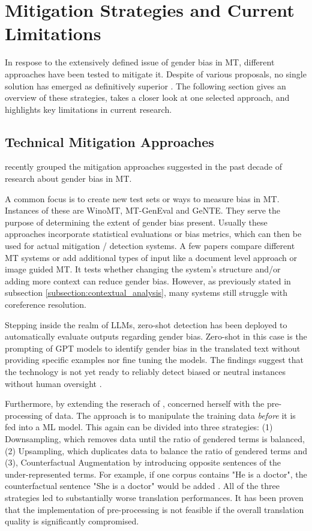 \section{Mitigation Strategies and Current Limitations}    

In respose to the extensively defined issue of gender bias in MT, different approaches have been tested to mitigate it. Despite of various proposals, no single solution has emerged as definitively superior \citep{savoldiDecadeGenderBias2025}. The following section gives an overview of these strategies, takes a closer look at one selected approach, and highlights key limitations in current research.

\subsection{Technical Mitigation Approaches}
\citet{savoldiDecadeGenderBias2025} recently grouped the mitigation approaches suggested in the past decade of research about gender bias in MT. 

A common focus is to create new test sets or ways to measure bias in MT. Instances of these are WinoMT, MT-GenEval and GeNTE. They serve the purpose of determining the extent of gender bias present. Usually these approaches incorporate statistical evaluations or bias metrics, which can then be used for actual mitigation / detection systems. A few papers compare different MT systems or add additional types of input like a document level approach or image guided MT. It tests whether changing the system's structure and/or adding more context can reduce gender bias. However, as previously stated in subsection \ref{subsection:contextual_analysis}, many systems still struggle with coreference resolution.

Stepping inside the realm of LLMs, zero-shot detection has been deployed to automatically evaluate outputs regarding gender bias. Zero-shot in this case is the prompting of GPT models to identify gender bias in the translated text without providing specific examples nor fine tuning the models. The findings suggest that the technology is not yet ready to reliably detect biased or neutral instances without human oversight \citep{lardelliBuildingBridgesDataset2024}. 

Furthermore, by extending the reserach of \citet{tomalinPracticalEthicsBias2021}, \citet{ullmannGenderBiasMachine2022} concerned herself with the pre-processing of data. The approach is to manipulate the training data \textit{before} it is fed into a ML model. This again can be divided into three strategies: (1) Downsampling, which removes data until the ratio of gendered terms is balanced, (2) Upsampling, which duplicates data to balance the ratio of gendered terms and (3), Counterfactual Augmentation by introducing opposite sentences of the under-represented terms. For example, if one corpus contains "He is a doctor", the counterfactual sentence "She is a doctor" would be added \citep{ullmannGenderBiasMachine2022}. All of the three strategies led to substantially worse translation performances. It has been proven that the implementation of pre-processing is not feasible if the overall translation quality is significantly compromised.


